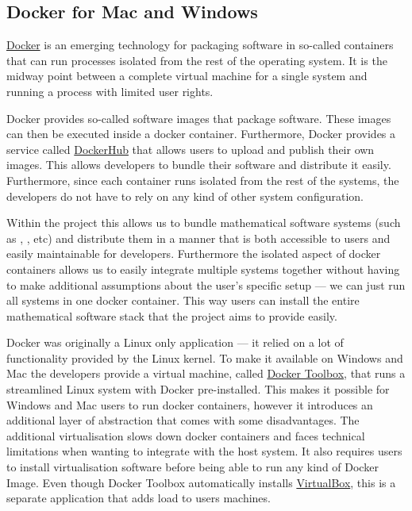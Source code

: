 \documentclass{deliverablereport}
\begin{document}
\subsection{Docker for Mac and Windows}
\label{sec:docker}


\href{https://www.docker.com}{Docker} is an emerging technology for
packaging software in so-called containers that can run processes
isolated from the rest of the operating system. It is the midway point
between a complete virtual machine for a single system and running a
process with limited user rights.

Docker provides so-called software images that package software. These
images can then be executed inside a docker container. Furthermore,
Docker provides a service called
\href{https://hub.docker.com/}{DockerHub} that allows users to upload
and publish their own images. This allows developers to bundle their
software and distribute it easily. Furthermore, since each container
runs isolated from the rest of the systems, the developers do not have
to rely on any kind of other system configuration.

Within the \ODK project this allows us to bundle mathematical software
systems (such as \GAP, \Sage, etc) and distribute them in a manner
that is both accessible to users and easily maintainable for
developers. Furthermore the isolated aspect of docker containers
allows us to easily integrate multiple systems together without having
to make additional assumptions about the user's specific setup --- we
can just run all systems in one docker container. This way users can
install the entire mathematical software stack that the \ODK project
aims to provide easily.

Docker was originally a Linux only application --- it relied on a lot
of functionality provided by the Linux kernel. To make it available on
Windows and Mac the developers provide a virtual machine, called
\href{https://www.docker.com/products/docker-toolbox}{Docker Toolbox},
that runs a streamlined Linux system with Docker pre-installed. This
makes it possible for Windows and Mac users to run docker containers,
however it introduces an additional layer of abstraction that comes
with some disadvantages. The additional virtualisation slows down
docker containers and faces technical limitations when wanting to
integrate with the host system. It also requires users to install
virtualisation software before being able to run any kind of Docker
Image. Even though Docker Toolbox automatically installs
\href{https://www.virtualbox.org/}{VirtualBox}, this is a separate
application that adds load to users machines.
\end{document}
